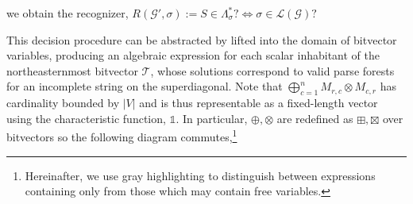 \documentclass[sigplan,review,anonymous,acmsmall]{acmart}\settopmatter{printfolios=false,printccs=false,printacmref=false}
\begin{document}
  \noindent we obtain the recognizer, $R(\mathcal{G}', \sigma) := S \in \Lambda^*_\sigma? \Leftrightarrow \sigma \in \mathcal{L}(\mathcal{G})?$

  This decision procedure can be abstracted by lifted into the domain of bitvector variables, producing an algebraic expression for each scalar inhabitant of the northeasternmost bitvector $\mathcal{T}$, whose solutions correspond to valid parse forests for an incomplete string on the superdiagonal. Note that $\bigoplus_{c = 1}^n M_{r,c} \otimes M_{c,r}$ has cardinality bounded by $|V|$ and is thus representable as a fixed-length vector using the characteristic function, $\mathds{1}$. In particular, $\oplus, \otimes$ are redefined as $\boxplus, \boxtimes$ over bitvectors so the following diagram commutes,\footnote{Hereinafter, we use gray highlighting to distinguish between expressions containing only  from those which may contain free variables.}
\end{document}
